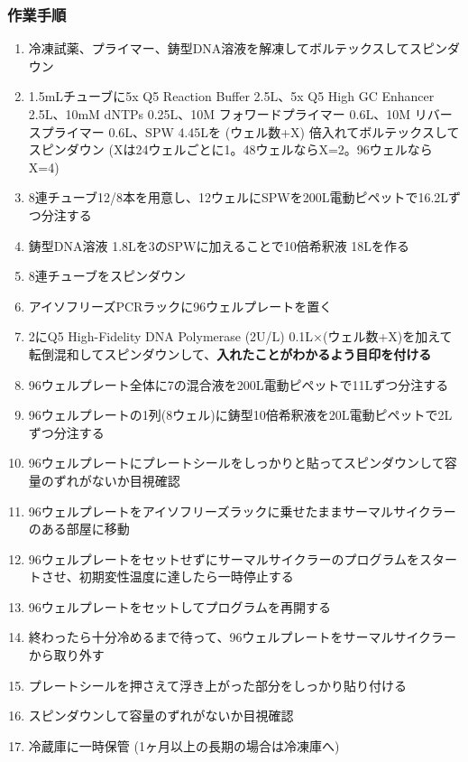 \documentclass[titlepage,10pt,a4paper,uplatex]{jsbook}
\renewcommand{\textbf}[1]{{\bfseries\sffamily#1}}
\begin{document}
\subsubsection{作業手順}
\begin{enumerate}
\item 冷凍試薬、プライマー、鋳型DNA溶液を解凍してボルテックスしてスピンダウン
\item 1.5mLチューブに5x Q5 Reaction Buffer 2.5{\textmu}L、5x Q5 High GC Enhancer 2.5{\textmu}L、10mM dNTPs 0.25{\textmu}L、10{\textmu}M フォワードプライマー 0.6{\textmu}L、10{\textmu}M リバースプライマー 0.6{\textmu}L、SPW 4.45{\textmu}Lを (ウェル数+X) 倍入れてボルテックスしてスピンダウン (Xは24ウェルごとに1。48ウェルならX=2。96ウェルならX=4)
\item 8連チューブ12/8本を用意し、12ウェルにSPWを200{\textmu}L電動ピペットで16.2{\textmu}Lずつ分注する
\item 鋳型DNA溶液 1.8{\textmu}Lを3のSPWに加えることで10倍希釈液 18{\textmu}Lを作る
\item 8連チューブをスピンダウン
\item アイソフリーズPCRラックに96ウェルプレートを置く
\item 2にQ5 High-Fidelity DNA Polymerase (2U/{\textmu}L) 0.1{\textmu}L×(ウェル数+X)を加えて転倒混和してスピンダウンして、\textbf{入れたことがわかるよう目印を付ける}
\item 96ウェルプレート全体に7の混合液を200{\textmu}L電動ピペットで11{\textmu}Lずつ分注する
\item 96ウェルプレートの1列(8ウェル)に鋳型10倍希釈液を20{\textmu}L電動ピペットで2{\textmu}Lずつ分注する
\item 96ウェルプレートにプレートシールをしっかりと貼ってスピンダウンして容量のずれがないか目視確認
\item 96ウェルプレートをアイソフリーズラックに乗せたままサーマルサイクラーのある部屋に移動
\item 96ウェルプレートをセットせずにサーマルサイクラーのプログラムをスタートさせ、初期変性温度に達したら一時停止する
\item 96ウェルプレートをセットしてプログラムを再開する
\item 終わったら十分冷めるまで待って、96ウェルプレートをサーマルサイクラーから取り外す
\item プレートシールを押さえて浮き上がった部分をしっかり貼り付ける
\item スピンダウンして容量のずれがないか目視確認
\item 冷蔵庫に一時保管 (1ヶ月以上の長期の場合は冷凍庫へ)
\end{enumerate}
\end{document}
